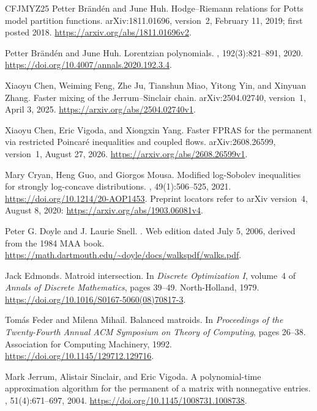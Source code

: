 \documentclass[11pt]{article}
\theoremstyle{definition}
\begin{document}
\begin{thebibliography}{CFJMYZ25}
Petter Br{\"a}nd{\'e}n and June Huh.
\newblock Hodge--Riemann relations for Potts model partition functions.
\newblock arXiv:1811.01696, version~2, February 11, 2019; first posted 2018.
\newblock \url{https://arxiv.org/abs/1811.01696v2}.

Petter Br{\"a}nd{\'e}n and June Huh.
\newblock Lorentzian polynomials.
, 192(3):821--891, 2020.
\newblock \url{https://doi.org/10.4007/annals.2020.192.3.4}.

Xiaoyu Chen, Weiming Feng, Zhe Ju, Tianshun Miao, Yitong Yin, and Xinyuan Zhang.
\newblock Faster mixing of the Jerrum--Sinclair chain.
\newblock arXiv:2504.02740, version~1, April 3, 2025.
\newblock \url{https://arxiv.org/abs/2504.02740v1}.

Xiaoyu Chen, Eric Vigoda, and Xiongxin Yang.
\newblock Faster {FPRAS} for the permanent via restricted {Poincar\'e}
  inequalities and coupled flows.
\newblock arXiv:2608.26599, version~1, August 27, 2026.
\newblock \url{https://arxiv.org/abs/2608.26599v1}.

Mary Cryan, Heng Guo, and Giorgos Mousa.
\newblock Modified log-Sobolev inequalities for strongly log-concave
  distributions.
, 49(1):506--525, 2021.
\newblock \url{https://doi.org/10.1214/20-AOP1453}.
\newblock Preprint locators refer to arXiv version~4, August 8, 2020:
  \url{https://arxiv.org/abs/1903.06081v4}.

Peter G. Doyle and J. Laurie Snell.
.
\newblock Web edition dated July 5, 2006, derived from the 1984 MAA book.
\newblock \url{https://math.dartmouth.edu/~doyle/docs/walkspdf/walks.pdf}.

Jack Edmonds.
\newblock Matroid intersection.
\newblock In {\em Discrete Optimization {I}}, volume~4 of {\em Annals of
  Discrete Mathematics}, pages 39--49. North-Holland, 1979.
\newblock \url{https://doi.org/10.1016/S0167-5060(08)70817-3}.

Tom{\'a}s Feder and Milena Mihail.
\newblock Balanced matroids.
\newblock In {\em Proceedings of the Twenty-Fourth Annual ACM Symposium
  on Theory of Computing}, pages 26--38. Association for Computing
  Machinery, 1992.
\newblock \url{https://doi.org/10.1145/129712.129716}.

Mark Jerrum, Alistair Sinclair, and Eric Vigoda.
\newblock A polynomial-time approximation algorithm for the permanent of a
  matrix with nonnegative entries.
, 51(4):671--697, 2004.
\newblock \url{https://doi.org/10.1145/1008731.1008738}.


\end{thebibliography}
\end{document}
